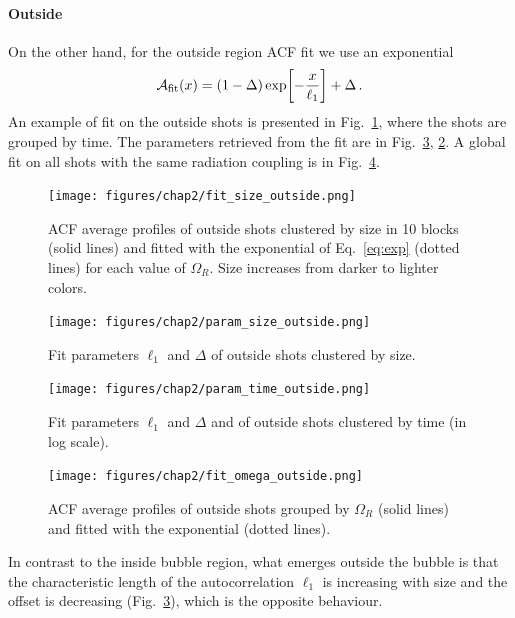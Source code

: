 \paragraph{Outside}
On the other hand, for the outside region ACF fit we use an exponential
\begin{equation}
    \mathcal{A}_{\rm fit}(x) = (1-\Delta)\exp[-\frac{x}{\ell_1}] + \Delta\, .
    \label{eq:exp}
\end{equation}
An example of fit on the outside shots is presented in Fig.\ \ref{fig:fit_time_outside}, where the shots are grouped by time. The parameters retrieved from the fit are in Fig.\ \ref{fig:param_time_outside}, \ref{fig:param_size_outside}. A global fit on all shots with the same radiation coupling is in Fig.\ \ref{fig:fit_omega_outside}.
\begin{figure}[h!]
    \centering
    \texttt{[image: figures/chap2/fit\_size\_outside.png]}
    \caption{ACF average profiles of outside shots clustered by size in 10 blocks (solid lines) and fitted with the exponential of Eq.\ \eqref{eq:exp} (dotted lines) for each value of $\Omega_R$. Size increases from darker to lighter colors.}
    \label{fig:fit_time_outside}
\end{figure}
\begin{figure}[h!]
    \centering
    \texttt{[image: figures/chap2/param\_size\_outside.png]}
    \caption{Fit parameters $\ell_1$ and $\Delta$ of outside shots clustered by size.}
    \label{fig:param_size_outside}
\end{figure}
\begin{figure}[h!]
    \centering
    \texttt{[image: figures/chap2/param\_time\_outside.png]}
    \caption{Fit parameters $\ell_1$ and $\Delta$ and of outside shots clustered by time (in log scale).}
    \label{fig:param_time_outside}
\end{figure}
\begin{figure}[h!]
    \centering
    \texttt{[image: figures/chap2/fit\_omega\_outside.png]}
    \caption{ACF average profiles of outside shots grouped by $\Omega_R$ (solid lines) and fitted with the exponential (dotted lines).}
    \label{fig:fit_omega_outside}
\end{figure}
In contrast to the inside bubble region, what emerges outside the bubble is that the characteristic length of the autocorrelation $\ell_1$ is increasing with size and the offset is decreasing (Fig.\ \ref{fig:param_time_outside}), which is the opposite behaviour.


